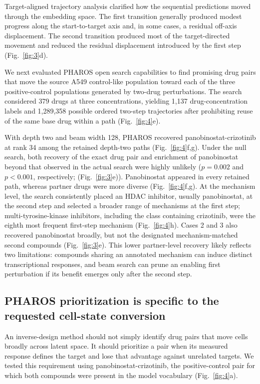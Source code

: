 \documentclass[11pt,a4paper]{article}
\begin{document}
Target-aligned trajectory analysis clarified how the sequential predictions moved through the embedding space. The first transition generally produced modest progress along the start-to-target axis and, in some cases, a residual off-axis displacement. The second transition produced most of the target-directed movement and reduced the residual displacement introduced by the first step (Fig.~\ref{fig:3}d).

We next evaluated PHAROS open search capabilities to find promising drug pairs that move the source A549 control-like population toward each of the three positive-control populations generated by two-drug perturbations. The search considered 379 drugs at three concentrations, yielding 1,137 drug-concentration labels and 1,289,358 possible ordered two-step trajectories after prohibiting reuse of the same base drug within a path (Fig.~\ref{fig:4}e).

With depth two and beam width 128, PHAROS recovered panobinostat-crizotinib at rank 34 among the retained depth-two paths (Fig.~\ref{fig:4}f,g). Under the null search, both recovery of the exact drug pair and enrichment of panobinostat  beyond that observed in the actual search were highly unlikely ($p=0.002$ and $p < 0.001$, respectively; (Fig.~\ref{fig:3}e)). Panobinostat appeared in every retained path, whereas partner drugs were more diverse (Fig.~\ref{fig:4}f,g). At the mechanism level, the search consistently placed an HDAC inhibitor, usually panobinostat, at the second step and selected a broader range of mechanisms at the first step; multi-tyrosine-kinase inhibitors, including the class containing crizotinib, were the eighth most frequent first-step mechanism (Fig.~\ref{fig:4}h). Cases 2 and 3 also recovered panobinostat broadly, but not the designated mechanism-matched second compounds (Fig.~\ref{fig:3}e). This lower partner-level recovery likely reflects two limitations: compounds sharing an annotated mechanism can induce distinct transcriptional responses, and beam search can prune an enabling first perturbation if its benefit emerges only after the second step. 

\subsection{PHAROS prioritization is specific to the requested cell-state conversion}\label{subsec4}

An inverse-design method should not simply identify drug pairs that move cells broadly across latent space. It should prioritize a pair when its measured response defines the target and lose that advantage against unrelated targets. We tested this requirement using panobinostat-crizotinib, the positive-control pair for which both compounds were present in the model vocabulary (Fig.~\ref{fig:4}a).
\end{document}
